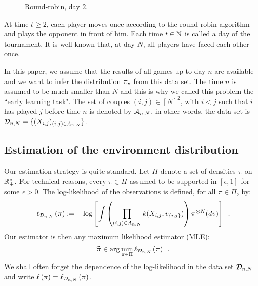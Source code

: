 \begin{figure}
\centering
{}
\caption{Round-robin, day $2$.}
\label{fig:robin:day2}
\end{figure}

At time $t\ge 2$, each player moves once according to the round-robin algorithm and plays the opponent in front of him. Each time $t\in\mathbb{N}$ is called a day of the tournament. It is well known that, at day $N$, all players have faced each other once. 

In this paper, we assume that the results of all games up to day $n$ are available and we want to infer the distribution $\pi_{\star}$ from this data set. The time $n$ is assumed to be much smaller than $N$ and this is why we called this problem the ``early learning task". The set of couples $(i,j)\in[N]^2$, with $i<j$ such that $i$ has played $j$ before time $n$ is denoted by $\mathcal{A}_{n,N}$, in other words, the data set is $\mathcal{D}_{n,N}=\{(X_{i,j})_{(i,j)\in A_{n,N}}\}$.


\subsection{Estimation of the environment distribution}
Our estimation strategy is quite standard. Let $\Pi$ denote a set of densities $\pi$ on $\mathbb{R}_+^*$. For technical reasons, every $\pi\in\Pi$ assumed to be supported in $[\epsilon,1]$ for some $\epsilon>0$. The log-likelihood of the observations is defined, for all $\pi\in\Pi$, by:
\begin{equation}
\label{eq:def:loglik}
\ell_{\mathcal{D}_{n,N}}\left(\pi\right):=-\log\left[\int  \left(\prod_{(i,j)\in A_{n,N}}k(X_{i,j},v_{\{i,j\}})\right)\pi^{\otimes N}(dv)\right]\enspace.
\end{equation}
Our estimator is then any maximum likelihood estimator (MLE):
\[
\widehat{\pi}\in \arg\min_{\pi\in\Pi}\ell_{\mathcal{D}_{n,N}}\left(\pi\right)\enspace.
\]
We shall often forget the dependence of the log-likelihood in the data set $\mathcal{D}_{n,N}$ and write $\ell\left(\pi\right)=\ell_{\mathcal{D}_{n,N}}\left(\pi\right)$.

